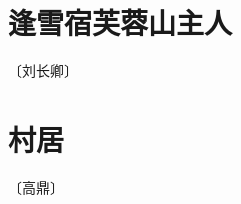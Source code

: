 \documentclass[12pt,UTF-8,openany]{ctexbook}
\begin{document}
\vspace{8pt}


\section{逢雪宿芙蓉山主人}

\begin{center}
    \vspace{10pt}
    
    \begin{normalsize}
        
        〔刘长卿〕
        
    \end{normalsize}
    
    \vspace{8pt}
    
    \begin{large}
        
        
        
    \end{large}
    
\end{center}

\vspace{8pt}


\section{村居}

\begin{center}
    \vspace{10pt}
    
    \begin{normalsize}
        
        〔高鼎〕
        
    \end{normalsize}
    
    \vspace{8pt}
    
    \begin{large}
        
        
        
    \end{large}
    
\end{center}
\end{document}

